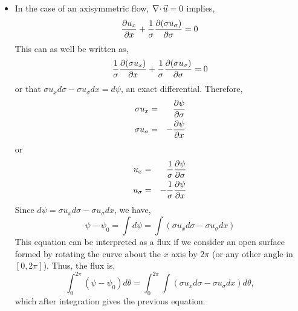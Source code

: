 \begin{itemize}
\item In the case of an axisymmetric flow, $\operatorname{\nabla\cdot}{\vec{u}} = 0$ implies,
\[
\frac{\partial{u_x}}{\partial{x}} + \frac{1}{\sigma}\frac{\partial{(\sigma u_\sigma)}}{\partial{\sigma}} = 0
\]
This can as well be written as,
\[
\frac{1}{\sigma}\frac{\partial{(\sigma u_x)}}{\partial{x}} + \frac{1}{\sigma}\frac{\partial{(\sigma u_\sigma)}}{\partial{\sigma}} = 0
\]
or that $\sigma u_x d\sigma - \sigma u_\sigma dx = d\psi$, an exact differential. Therefore,
\begin{eqnarray*}
\sigma u_x &=& \frac{\partial{\psi}}{\partial{\sigma}} \\
\sigma u_\sigma &=& -\frac{\partial{\psi}}{\partial{x}}
\end{eqnarray*}
or
\begin{eqnarray*}
u_x &=& \frac{1}{\sigma}\frac{\partial{\psi}}{\partial{\sigma}} \\
u_\sigma &=& -\frac{1}{\sigma}\frac{\partial{\psi}}{\partial{x}}
\end{eqnarray*}
Since $d\psi = \sigma u_x d\sigma - \sigma u_\sigma dx$, we have,
\[
\psi - \psi_0 = \int d\psi = \int (\sigma u_x d\sigma - \sigma u_\sigma dx)
\]
This equation can be interpreted as a flux if we consider an open surface formed by rotating the curve about the $x$ axis by $2\pi$ (or any other angle in $[0, 2\pi]$). Thus, the
flux is,
\[
\int_0^{2\pi} (\psi - \psi_0)d\theta = \int_0^{2\pi} \int (\sigma u_x d\sigma - \sigma u_\sigma dx) d\theta,
\]
which after integration gives the previous equation.
\end{itemize}

